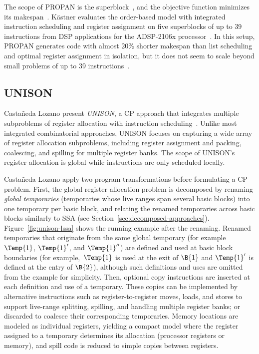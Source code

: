 \documentclass[acmsmall,authorversion,nonacm]{acmart}
\begin{document}
The scope of PROPAN is the superblock~\cite[Chapter 7]{Kastner2000b},
and the objective function minimizes its makespan~\cite[Chapter
  5]{Kastner2000b}.
K\"{a}stner evaluates the order-based model with integrated
instruction scheduling and register assignment on five superblocks of
up to 39 instructions from DSP applications for the ADSP-2106x
processor~\cite{SH}.
In this setup, PROPAN generates code with almost 20\% shorter
makespan than list scheduling and optimal register assignment in
isolation, but it does not seem to scale beyond small problems of up
to 39 instructions~\cite{Kastner2001}.

\subsection{UNISON}\label{sec:unison}

Casta\~{n}eda Lozano \etal{} present \emph{UNISON}, a CP approach that
integrates multiple subproblems of register allocation with
instruction scheduling~\cite{Castaneda2012}.
Unlike most integrated combinatorial approaches, UNISON focuses on
capturing a wide array of register allocation subproblems, including
register assignment and packing, coalescing, and spilling for multiple
register banks.
The scope of UNISON's register allocation is global while instructions
are only scheduled locally.

Casta\~{n}eda Lozano \etal{} apply two program transformations before
formulating a CP problem.
First, the global register allocation problem is decomposed by
renaming \emph{global temporaries} (temporaries whose live ranges span
several basic blocks) into one temporary per basic block, and relating
the renamed temporaries across basic blocks similarly to SSA (see
Section~\ref{sec:decomposed-approaches}).
Figure~\ref{fig:unison-lssa} shows the running example after the
renaming.
Renamed temporaries that originate from the same global temporary (for
example $\Temp{1}$, $\Temp{1}'$, and $\Temp{1}''$) are defined and
used at basic block boundaries (for example,~$\Temp{1}$ is used at the
exit of $\B{1}$ and $\Temp{1}'$ is defined at the entry of $\B{2}$),
although such definitions and uses are omitted from the example for
simplicity.
Then, optional copy instructions are inserted at each definition and
use of a temporary.
These copies can be implemented by alternative instructions such as
register-to-register moves, loads, and stores to support live-range
splitting, spilling, and handling multiple register banks; or
discarded to coalesce their corresponding temporaries.
Memory locations are modeled as individual registers, yielding a
compact model where the register assigned to a temporary determines
its allocation (processor registers or memory), and spill code is
reduced to simple copies between registers.
\end{document}
